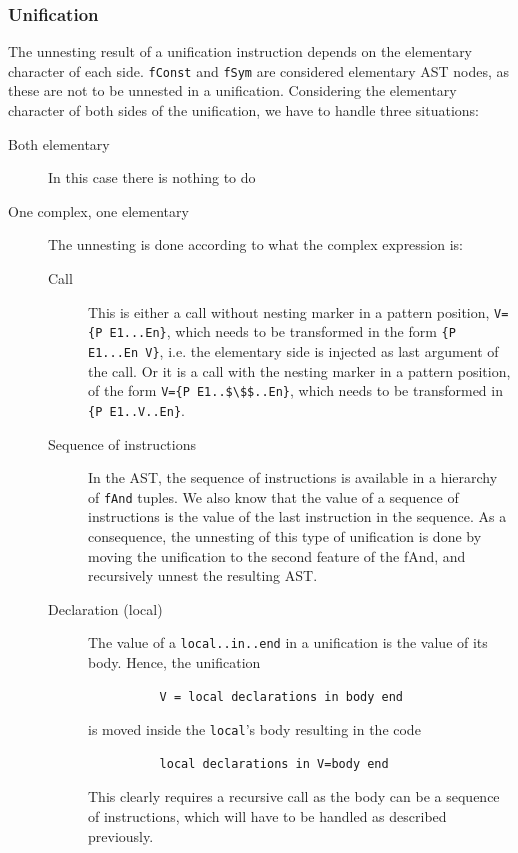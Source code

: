 \documentclass[a4paper]{memoir}
\begin{document}
\subsubsection{Unification}\label{sec:arch:unnester:unification}
The unnesting result of a unification instruction depends on the elementary
character of each side. \lstinline!fConst! and \lstinline!fSym! are considered elementary AST nodes, as these are not to be unnested in a unification.
Considering the elementary character of both sides of the unification, we have to handle three situations:
\begin{description}
  \item[Both elementary]In this case there is nothing to do
  \item[One complex, one elementary] The unnesting is done according to what the
    complex expression is: 
    \begin{description}
      \item[Call] This is either a call without nesting marker in a pattern position, \lstinline!V={P E1...En}!,
        which needs to be transformed in the form \lstinline!{P E1...En V}!, i.e. the elementary side is injected as last argument of the call.
        Or it is a call with the nesting marker in a pattern position, of the form \lstinline[mathescape]!V={P E1..$\$$..En}!, which needs to be
        transformed in \lstinline!{P E1..V..En}!.
      \item[Sequence of instructions] In the AST, the sequence of instructions is available in a hierarchy of \lstinline!fAnd! tuples. We also know that the value of a sequence of instructions is the value of the last instruction in the sequence. As a consequence, the unnesting of this type of unification is done by moving the unification to the second feature of the fAnd, and recursively unnest the resulting AST.
      \item[Declaration (local)] The value of a \lstinline!local..in..end! in a
        unification is the value of its body. Hence, the unification
        \begin{lstlisting}
          V = local declarations in body end
        \end{lstlisting}
        is moved inside the
        \lstinline!local!'s body resulting in the code 
        \begin{lstlisting}
          local declarations in V=body end
        \end{lstlisting}
        This clearly requires a recursive call as the body can be a sequence of instructions, which will have to be handled as described previously.

\end{description}
\end{description}
\end{document}
